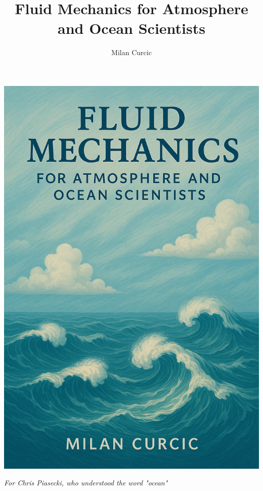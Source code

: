 \documentclass[12pt]{article}
\numberwithin{equation}{section}
\numberwithin{figure}{section}
\numberwithin{table}{section}
\begin{document}
\begin{titlepage}
\thispagestyle{empty}
\includegraphics[width=\textwidth,height=\textheight]{cover.png}
\end{titlepage}

\title{Fluid Mechanics for Atmosphere and Ocean Scientists}
\author{Milan Curcic}
\maketitle

\tableofcontents

\newpage
\begin{center}
\vspace*{\fill}
\large
\textit{For Chris Piasecki, who understood the word "ocean"}
\vspace*{\fill}
\end{center}
\end{document}
